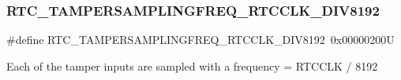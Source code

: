 \subsubsection{\texorpdfstring{R\+T\+C\+\_\+\+T\+A\+M\+P\+E\+R\+S\+A\+M\+P\+L\+I\+N\+G\+F\+R\+E\+Q\+\_\+\+R\+T\+C\+C\+L\+K\+\_\+\+D\+I\+V8192}{RTC\_TAMPERSAMPLINGFREQ\_RTCCLK\_DIV8192}}
{\footnotesize\ttfamily \#define R\+T\+C\+\_\+\+T\+A\+M\+P\+E\+R\+S\+A\+M\+P\+L\+I\+N\+G\+F\+R\+E\+Q\+\_\+\+R\+T\+C\+C\+L\+K\+\_\+\+D\+I\+V8192~0x00000200U}

Each of the tamper inputs are sampled with a frequency = R\+T\+C\+C\+LK / 8192 